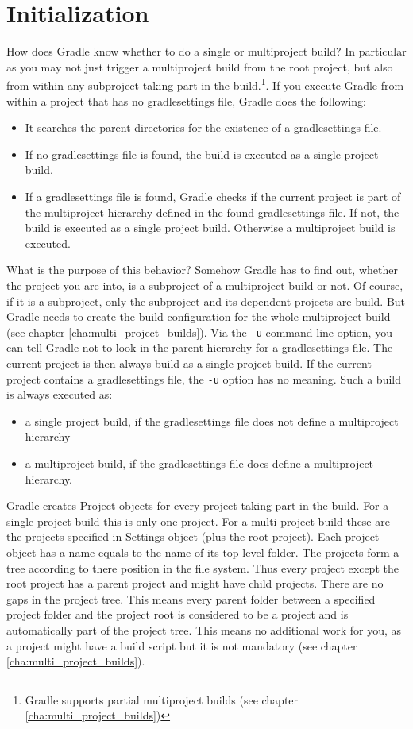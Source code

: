 \section{Initialization} %
\label{sec:initialization}
How does Gradle know whether to do a single or multiproject build? In particular as you may not just trigger a multiproject build from the root project, but also from within any subproject taking part in the build.\footnote{Gradle supports partial multiproject builds (see chapter \ref{cha:multi_project_builds})}. If you execute Gradle from within a project that has no gradlesettings file, Gradle does the following:
\begin{itemize}
	\item It searches the parent directories for the existence of a gradlesettings file.
	\item If no gradlesettings file is found, the build is executed as a single project build.
    \item If a gradlesettings file is found, Gradle checks if the current project is part of the multiproject hierarchy defined in the found gradlesettings file. If not, the build is executed as a single project build. Otherwise a multiproject build is executed.
\end{itemize}
What is the purpose of this behavior? Somehow Gradle has to find out, whether the project you are into, is a subproject of a multiproject build or not. Of course, if it is a subproject, only the subproject and its dependent projects are build. But Gradle needs to create the build configuration for the whole multiproject build (see chapter \ref{cha:multi_project_builds}). Via the \texttt{-u} command line option, you can tell Gradle not to look in the parent hierarchy for a gradlesettings file. The current project is then always build as a single project build. If the current project contains a gradlesettings file, the \texttt{-u} option has no meaning. Such a build is always executed as:
\begin{itemize}
	\item a single project build, if the gradlesettings file does not define a multiproject hierarchy
    \item a multiproject build, if the gradlesettings file does define a multiproject hierarchy.
\end{itemize}
Gradle creates Project objects for every project taking part in the build. For a single project build this is only one project. For a multi-project build these are the projects specified in Settings object (plus the root project). Each project object has a name equals to the name of its top level folder. The projects form a tree according to there position in the file system. Thus every project except the root project has a parent project and might have child projects. There are no gaps in the project tree. This means every parent folder between a specified project folder and the project root is considered to be a project and is automatically part of the project tree. This means no additional work for you, as a project might have a build script but it is not mandatory (see chapter \ref{cha:multi_project_builds}).


